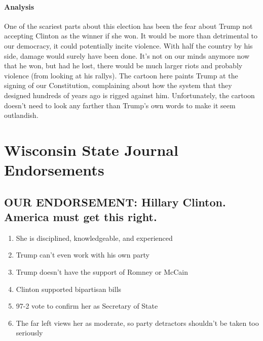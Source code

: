 \documentclass[twoside]{article}
\begin{document}
              \paragraph{Analysis} One of the scariest parts about this election has been the fear about Trump not accepting Clinton as the winner if she won. It would be more than
              detrimental to our democracy, it could potentially incite violence. With half the country by his side, damage would surely have been done. It's not on our minds anymore
              now that he won, but had he lost, there would be much larger riots and probably violence (from looking at his rallys). The cartoon here paints Trump at the signing of
              our Constitution, complaining about how the system that they designed hundreds of years ago is rigged against him. Unfortunately, the cartoon doesn't need to look any
              farther than Trump's own words to make it seem outlandish.
              \newpage
              \section{Wisconsin State Journal Endorsements}
              \subsection{OUR ENDORSEMENT: Hillary Clinton. America must get this right.
              }
              \begin{enumerate}[*]
                \item She is disciplined, knowledgeable, and experienced
                \item Trump can’t even work with his own party
                \item Trump doesn’t have the support of Romney or McCain
                \item Clinton supported bipartisan bills
                \item 97-2 vote to confirm her as Secretary of State
                \item The far left views her as moderate, so party detractors shouldn’t be taken too seriously
              \end{enumerate}
\end{document}
